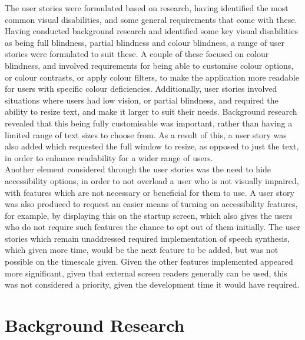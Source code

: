 The user stories were formulated based on research, having identified the most common visual disabilities, and some general requirements that come with these. Having conducted background research and identified some key visual disabilities as being full blindness, partial blindness and colour blindness, a range of user stories were formulated to suit these. A couple of these focused on colour blindness, and involved requirements for being able to customise colour options, or colour contrasts, or apply colour filters, to make the application more readable for users with specific colour deficiencies. Additionally, user stories involved situations where users had low vision, or partial blindness, and required the ability to resize text, and make it larger to suit their needs. Background research revealed that this being fully customisable was important, rather than having a limited range of text sizes to choose from. As a result of this, a user story was also added which requested the full window to resize, as opposed to just the text, in order to enhance readability for a wider range of users.\\

Another element considered through the user stories was the need to hide accessibility options, in order to not overload a user who is not visually impaired, with features which are not necessary or beneficial for them to use. A user story was also produced to request an easier means of turning on accessibility features, for example, by displaying this on the startup screen, which also gives the users who do not require such features the chance to opt out of them initially. The user stories which remain unaddressed required implementation of speech synthesis, which given more time, would be the next feature to be added, but was not possible on the timescale given. Given the other features implemented appeared more significant, given that external screen readers generally can be used, this was not considered a priority, given the development time it would have required. 

\section{\textbf{Background Research}}

